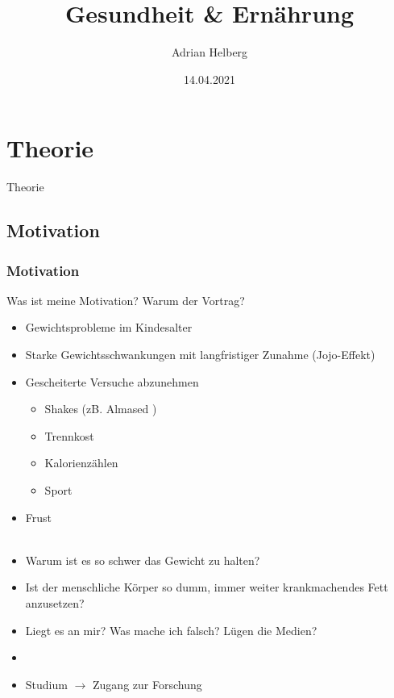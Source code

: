 \documentclass[xcolor=dvipsnames]{beamer}
\title{Gesundheit \& Ernährung}
\author{Adrian Helberg}
\date{14.04.2021}
\begin{document}
    \maketitle


    \section{Theorie}
    {
    \begin{frame}
        \begin{center}
            \Huge Theorie
        \end{center}
    \end{frame}
    }

    \subsection{Motivation}
    \begin{frame}[allowframebreaks]
        \frametitle{Motivation}
        \begin{block}{Was ist meine Motivation? Warum der Vortrag?}
            ~
            \begin{itemize}
                \setlength\itemsep{1em}
                \item Gewichtsprobleme im Kindesalter
                \item Starke Gewichtsschwankungen mit langfristiger Zunahme (Jojo-Effekt)
                \item Gescheiterte Versuche abzunehmen
                \begin{itemize}
                    \setlength\itemsep{0.6em}
                    \item Shakes (zB. Almased \textregistered)
                    \item Trennkost
                    \item Kalorienzählen
                    \item Sport
                \end{itemize}
                \item Frust\\~
            \end{itemize}
        \end{block}

        \framebreak

        \begin{itemize}
            \setlength\itemsep{1em}
            \item Warum ist es so schwer das Gewicht zu halten?
            \item Ist der menschliche Körper so dumm, immer weiter krankmachendes Fett anzusetzen?
            \item Liegt es an mir? Was mache ich falsch? Lügen die Medien?
            \item[]
            \item Studium $\rightarrow$ Zugang zur Forschung
        \end{itemize}
    \end{frame}
\end{document}
